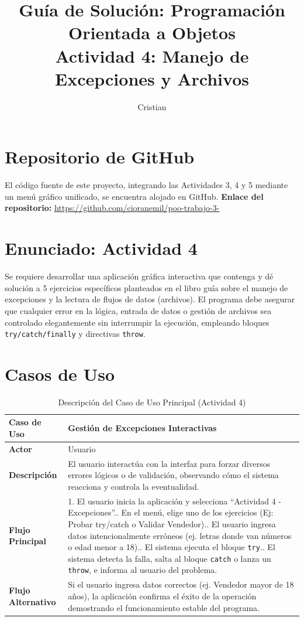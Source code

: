 \documentclass[12pt,a4paper]{article}
\title{\textbf{Guía de Solución: Programación Orientada a Objetos} \\ \large Actividad 4: Manejo de Excepciones y Archivos}
\author{Cristian}
\date{}
\begin{document}
\maketitle

\section{Repositorio de GitHub}
El código fuente de este proyecto, integrando las Actividades 3, 4 y 5 mediante un menú gráfico unificado, se encuentra alojado en GitHub. 
\newline
\textbf{Enlace del repositorio:} \url{https://github.com/cioranemil/poo-trabajo-3-}

\section{Enunciado: Actividad 4}
Se requiere desarrollar una aplicación gráfica interactiva que contenga y dé solución a 5 ejercicios específicos planteados en el libro guía sobre el manejo de excepciones y la lectura de flujos de datos (archivos). El programa debe asegurar que cualquier error en la lógica, entrada de datos o gestión de archivos sea controlado elegantemente sin interrumpir la ejecución, empleando bloques \texttt{try/catch/finally} y directivas \texttt{throw}.

\section{Casos de Uso}
\begin{table}[h]
    \centering
    \begin{tabular}{|p{3cm}|p{12cm}|}
    \hline
    \textbf{Caso de Uso} & \textbf{Gestión de Excepciones Interactivas} \\ \hline
    \textbf{Actor} & Usuario \\ \hline
    \textbf{Descripción} & El usuario interactúa con la interfaz para forzar diversos errores lógicos o de validación, observando cómo el sistema reacciona y controla la eventualidad. \\ \hline
    \textbf{Flujo Principal} & 
    1. El usuario inicia la aplicación y selecciona ``Actividad 4 - Excepciones''.\newline
    2. En el menú, elige uno de los ejercicios (Ej: Probar try/catch o Validar Vendedor).\newline
    3. El usuario ingresa datos intencionalmente erróneos (ej. letras donde van números o edad menor a 18).\newline
    4. El sistema ejecuta el bloque \texttt{try}.\newline
    5. El sistema detecta la falla, salta al bloque \texttt{catch} o lanza un \texttt{throw}, e informa al usuario del problema. \\ \hline
    \textbf{Flujo Alternativo} & 
    Si el usuario ingresa datos correctos (ej. Vendedor mayor de 18 años), la aplicación confirma el éxito de la operación demostrando el funcionamiento estable del programa. \\ \hline
    \end{tabular}
    \caption{Descripción del Caso de Uso Principal (Actividad 4)}
\end{table}
\end{document}
